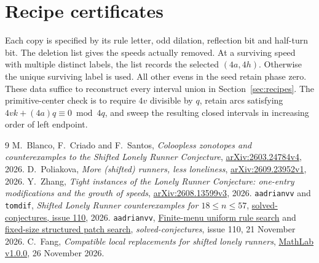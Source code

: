\documentclass[11pt]{article}
\theoremstyle{definition}
\begin{document}
\appendix
\section{Recipe certificates}\label{app:recipes}

Each copy is specified by its rule letter, odd dilation, reflection bit
and half-turn bit. The deletion list gives the speeds actually removed.
At a surviving speed with multiple distinct labels, the list records
the selected \((4a,4h)\). Otherwise the unique surviving label is
used. All other evens in the seed retain phase zero. These data suffice
to reconstruct every interval union in Section~\ref{sec:recipes}.
The primitive-center check is to require \(4v\) divisible by \(q\),
retain arcs satisfying \(4vk+(4a)q\equiv0\bmod 4q\), and sweep the
resulting closed intervals in increasing order of left endpoint.



\begingroup
\small
\begin{thebibliography}{9}
M.~Blanco, F.~Criado and F.~Santos,
\emph{Coloopless zonotopes and counterexamples to the Shifted Lonely
Runner Conjecture}, \href{https://arxiv.org/abs/2603.24784v4}
{arXiv:2603.24784v4}, 2026.
D.~Poliakova, \emph{More (shifted) runners, less loneliness},
\href{https://arxiv.org/abs/2609.23952v1}{arXiv:2609.23952v1}, 2026.
Y.~Zhang, \emph{Tight instances of the Lonely Runner Conjecture:
one-entry modifications and the growth of speeds},
\href{https://arxiv.org/abs/2608.13599v3}{arXiv:2608.13599v3}, 2026.
\texttt{aadrianvv} and \texttt{tomdif},
\emph{Shifted Lonely Runner counterexamples for \(18\le n\le57\)},
\href{https://github.com/1337isnot1337/solved-conjectures/issues/110}
{solved-conjectures, issue 110}, 2026.
\texttt{aadrianvv},
\href{https://github.com/1337isnot1337/solved-conjectures/issues/110\#issuecomment-7055867934}{Finite-menu uniform rule search} and
\href{https://github.com/1337isnot1337/solved-conjectures/issues/110\#issuecomment-7060116112}{fixed-size structured patch search},
\emph{solved-conjectures}, issue 110, 21 November 2026.
C.~Fang, \emph{Compatible local replacements for shifted lonely runners},
\href{https://github.com/F1Justin/MathLab/blob/ef98c0707e3a9e1b6b66f905aadd24ea6e38cadc/papers/runners/compatible-replacements.pdf}{MathLab v1.0.0}, 26 November 2026.
\end{thebibliography}
\endgroup
\end{document}
